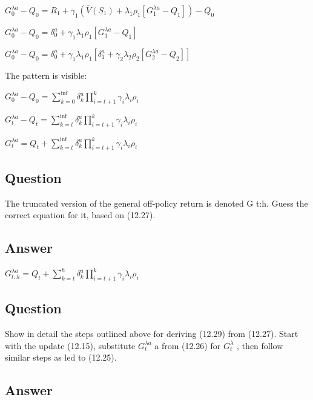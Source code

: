 \documentclass[11pt]{article}
\begin{document}
    \noindent $  G_{0}^{\lambda a} - Q_{0} = R_{1} + \gamma_{1} (\bar{V}(S_{1}) + \lambda_{1} \rho_{1} [ G_{1}^{\lambda a} -Q_{1}] ) -  Q_{0} $

    \noindent $  G_{0}^{\lambda a} - Q_{0} =  \delta_{0}^{a} + \gamma_{1} \lambda_{1} \rho_{1} [ G_{1}^{\lambda a} -Q_{1}] $

    \noindent $  G_{0}^{\lambda a} - Q_{0} =  \delta_{0}^{a} + \gamma_{1} \lambda_{1} \rho_{1} [   \delta_{1}^{a} + \gamma_{2} \lambda_{2} \rho_{2} [ G_{2}^{\lambda a} -Q_{2}]   ] $

    \hfill \break
    \noindent The pattern is visible:

    \noindent $  G_{0}^{\lambda a} - Q_{0} =  \sum_{k=0}^{\inf} \delta_{k}^{a} \prod_{i=t+1}^{k} \gamma_{i} \lambda_{i} \rho_{i} $

    \noindent $  G_{t}^{\lambda a} - Q_{t} =  \sum_{k=t}^{\inf} \delta_{k}^{a} \prod_{i=t+1}^{k} \gamma_{i} \lambda_{i} \rho_{i} $

    \noindent $  G_{t}^{\lambda a}  =   Q_{t} + \sum_{k=t}^{\inf} \delta_{k}^{a} \prod_{i=t+1}^{k} \gamma_{i} \lambda_{i} \rho_{i} $


    \subsection{Question}

    The truncated version of the general off-policy return is denoted G t:h.
    Guess the correct equation for it, based on (12.27).

    \subsection*{Answer}

    \noindent $  G_{t:h}^{\lambda a}  =   Q_{t} + \sum_{k=t}^{h} \delta_{k}^{a} \prod_{i=t+1}^{k} \gamma_{i} \lambda_{i} \rho_{i} $


    \subsection{Question}

    Show in detail the steps outlined above for deriving (12.29) from (12.27).
    Start with the update (12.15), substitute $G_{t}^{\lambda a}$ a from (12.26) for $G_{t}^{\lambda}$ , then follow similar steps as led to (12.25).

    \subsection*{Answer}
\end{document}
